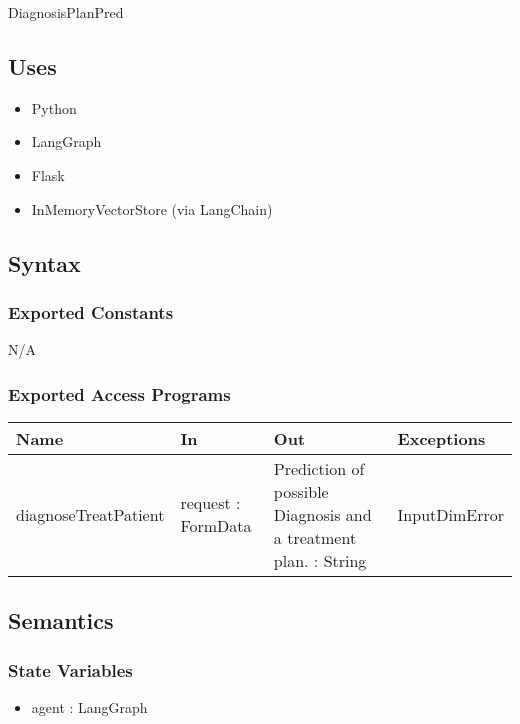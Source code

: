 \documentclass[12pt, titlepage]{article}
\begin{document}
DiagnosisPlanPred

\subsection{Uses}
\begin{itemize}
  \item Python
  \item LangGraph
  \item Flask
  \item InMemoryVectorStore (via LangChain)
\end{itemize}

\subsection{Syntax}

\subsubsection{Exported Constants}
N/A

\subsubsection{Exported Access Programs}

\begin{center}
\begin{tabular}{p{5cm} p{4cm} p{4cm} p{3cm}}
\hline
\textbf{Name} & \textbf{In} & \textbf{Out} & \textbf{Exceptions} \\
\hline
diagnoseTreatPatient & request : FormData & Prediction of possible Diagnosis and a treatment plan. : String & InputDimError \\
\hline
\end{tabular}
\end{center}

\subsection{Semantics}

\subsubsection{State Variables}

\begin{itemize}
  \item agent : LangGraph
\end{itemize}
\end{document}
